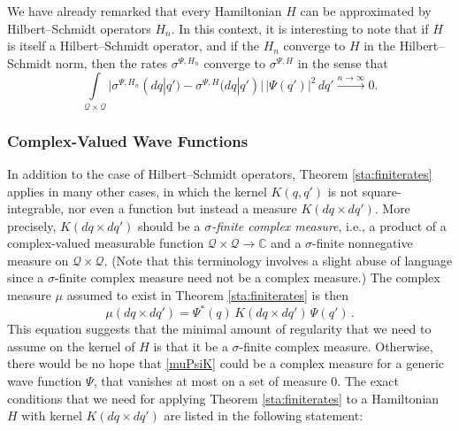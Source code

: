 \documentclass[12pt]{article}
\newcommand{\CCC}{\mathbb{C}} %
\newcommand{\1}{\mathbf{1}} %
\newcommand{\conf}{\mathcal{Q}} %
\begin{document}
We have already remarked that every Hamiltonian $H$ can be
approximated by Hilbert--Schmidt operators $H_n$. In this context, it
is interesting to note that if $H$ is itself a Hilbert--Schmidt
operator, and if the $H_n$ converge to $H$ in the Hilbert--Schmidt
norm, then the rates $\sigma^{\Psi,H_n}$ converge to $\sigma^{\Psi,H}$
in the sense that
\[
   \int\limits_{\conf \times \conf}\big|\sigma^{\Psi,H_n}(dq|q') -
   \sigma^{\Psi,H}(dq|q')\big| \, |\Psi(q')|^2\, dq' \stackrel{n \to
   \infty}{\longrightarrow} 0.
\]



\subsubsection{Complex-Valued Wave Functions}\label{sec:Cwf}

In addition to the case of  Hilbert--Schmidt operators, Theorem
\ref{sta:finiterates}
applies in many other cases, in which the kernel $K(q,q')$ is not
square-integrable, nor  even a function but instead a measure $K(dq
\times dq')$. More precisely, $K(dq \times dq')$ should be a
\emph{$\sigma$-finite complex measure}, i.e., a product of a
complex-valued measurable function $\conf \times \conf \to \CCC$ and a
$\sigma$-finite nonnegative measure on $\conf \times \conf$. (Note
that this  terminology involves a slight abuse of language  since a
$\sigma$-finite complex measure need not be a complex measure.) The
complex measure $\mu$ assumed to exist  in Theorem \ref{sta:finiterates}
is then
\begin{equation}\label{muPsiK}
   \mu( dq \times dq') = \Psi^*(q) \, K(dq \times dq') \, \Psi(q') \,.
\end{equation}
This equation suggests that the minimal amount of regularity that we
need to assume on the kernel of $H$ is that it be a $\sigma$-finite
complex measure. Otherwise, there would be no hope that \eqref{muPsiK}
could be a complex measure for a generic wave function $\Psi$, that
vanishes at most on a set of measure $0$.  The exact conditions that
we need for applying Theorem \ref{sta:finiterates} to a Hamiltonian
$H$ with kernel $K(dq \times dq')$ are listed in the following
statement:
\end{document}
